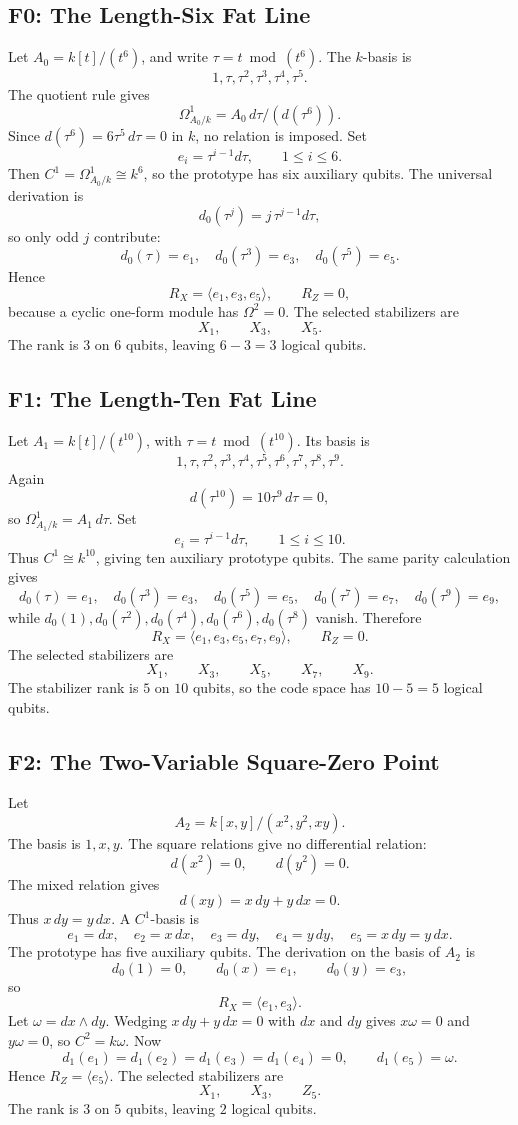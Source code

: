 \subsection{F0: The Length-Six Fat Line}
Let \(A_0=k[t]/(t^6)\), and write \(\tau=t\bmod(t^6)\).  The \(k\)-basis is
\[
  1,\tau,\tau^2,\tau^3,\tau^4,\tau^5.
\]
The quotient rule gives
\[
  \Omega^1_{A_0/k}=A_0\,d\tau/(d(\tau^6)).
\]
Since \(d(\tau^6)=6\tau^5\,d\tau=0\) in \(k\), no relation is imposed.  Set
\[
  e_i=\tau^{i-1}d\tau,\qquad 1\le i\le 6.
\]
Then \(C^1=\Omega^1_{A_0/k}\cong k^6\), so the prototype has six auxiliary
qubits.  The
universal derivation is
\[
  d_0(\tau^j)=j\,\tau^{j-1}d\tau,
\]
so only odd \(j\) contribute:
\[
  d_0(\tau)=e_1,\quad d_0(\tau^3)=e_3,\quad d_0(\tau^5)=e_5.
\]
Hence
\[
  R_X=\langle e_1,e_3,e_5\rangle,\qquad R_Z=0,
\]
because a cyclic one-form module has \(\Omega^2=0\).  The selected
stabilizers are
\[
  X_1,\qquad X_3,\qquad X_5.
\]
The rank is \(3\) on \(6\) qubits, leaving \(6-3=3\) logical qubits.
\subsection{F1: The Length-Ten Fat Line}
Let \(A_1=k[t]/(t^{10})\), with \(\tau=t\bmod(t^{10})\).  Its basis is
\[
  1,\tau,\tau^2,\tau^3,\tau^4,\tau^5,\tau^6,\tau^7,\tau^8,\tau^9.
\]
Again
\[
  d(\tau^{10})=10\tau^9\,d\tau=0,
\]
so \(\Omega^1_{A_1/k}=A_1\,d\tau\).  Set
\[
  e_i=\tau^{i-1}d\tau,\qquad 1\le i\le 10.
\]
Thus \(C^1\cong k^{10}\), giving ten auxiliary prototype qubits.  The same
parity calculation gives
\[
  d_0(\tau)=e_1,\quad d_0(\tau^3)=e_3,\quad d_0(\tau^5)=e_5,\quad
  d_0(\tau^7)=e_7,\quad d_0(\tau^9)=e_9,
\]
while \(d_0(1),d_0(\tau^2),d_0(\tau^4),d_0(\tau^6),d_0(\tau^8)\) vanish.
Therefore
\[
  R_X=\langle e_1,e_3,e_5,e_7,e_9\rangle,\qquad R_Z=0.
\]
The selected stabilizers are
\[
  X_1,\qquad X_3,\qquad X_5,\qquad X_7,\qquad X_9.
\]
The stabilizer rank is \(5\) on \(10\) qubits, so the code space has
\(10-5=5\) logical qubits.
\subsection{F2: The Two-Variable Square-Zero Point}
Let
\[
  A_2=k[x,y]/(x^2,y^2,xy).
\]
The basis is \(1,x,y\).  The square relations give no differential relation:
\[
  d(x^2)=0,\qquad d(y^2)=0.
\]
The mixed relation gives
\[
  d(xy)=x\,dy+y\,dx=0.
\]
Thus \(x\,dy=y\,dx\).  A \(C^1\)-basis is
\[
  e_1=dx,\quad e_2=x\,dx,\quad e_3=dy,\quad e_4=y\,dy,\quad
  e_5=x\,dy=y\,dx.
\]
The prototype has five auxiliary qubits.  The derivation on the basis of \(A_2\)
is
\[
  d_0(1)=0,\qquad d_0(x)=e_1,\qquad d_0(y)=e_3,
\]
so
\[
  R_X=\langle e_1,e_3\rangle.
\]
Let \(\omega=dx\wedge dy\).  Wedging \(x\,dy+y\,dx=0\) with \(dx\) and \(dy\)
gives \(x\omega=0\) and \(y\omega=0\), so \(C^2=k\omega\).  Now
\[
  d_1(e_1)=d_1(e_2)=d_1(e_3)=d_1(e_4)=0,\qquad d_1(e_5)=\omega.
\]
Hence \(R_Z=\langle e_5\rangle\).  The selected stabilizers are
\[
  X_1,\qquad X_3,\qquad Z_5.
\]
The rank is \(3\) on \(5\) qubits, leaving \(2\) logical qubits.
